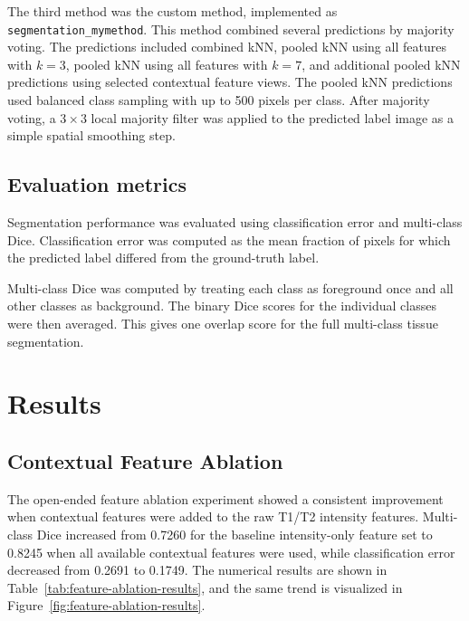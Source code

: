\documentclass[10pt,a4paper,twoside]{article}
\begin{document}
The third method was the custom method, implemented as \texttt{segmentation\_mymethod}. This method combined several predictions by majority voting. The predictions included combined kNN, pooled kNN using all features with $k=3$, pooled kNN using all features with $k=7$, and additional pooled kNN predictions using selected contextual feature views. The pooled kNN predictions used balanced class sampling with up to 500 pixels per class. After majority voting, a $3 \times 3$ local majority filter was applied to the predicted label image as a simple spatial smoothing step.

\subsection{Evaluation metrics}

Segmentation performance was evaluated using classification error and multi-class Dice. Classification error was computed as the mean fraction of pixels for which the predicted label differed from the ground-truth label.

Multi-class Dice was computed by treating each class as foreground once and all other classes as background. The binary Dice scores for the individual classes were then averaged. This gives one overlap score for the full multi-class tissue segmentation.


\section{Results}

\subsection{Contextual Feature Ablation}

The open-ended feature ablation experiment showed a consistent improvement when contextual features were added to the raw T1/T2 intensity features. Multi-class Dice increased from 0.7260 for the baseline intensity-only feature set to 0.8245 when all available contextual features were used, while classification error decreased from 0.2691 to 0.1749. The numerical results are shown in Table~\ref{tab:feature-ablation-results}, and the same trend is visualized in Figure~\ref{fig:feature-ablation-results}.
\end{document}
